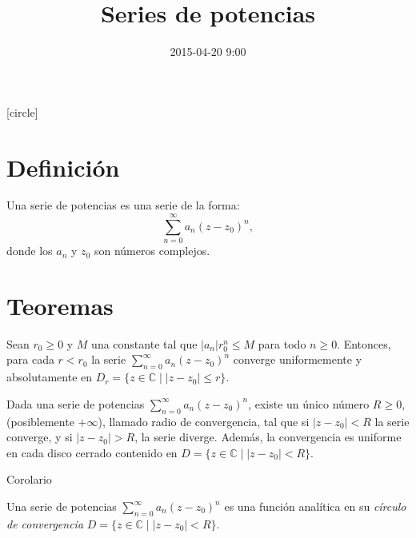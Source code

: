 \documentclass[spanish,presentation]{beamer}
\date{2015-04-20 9:00}
\title{Series de potencias}
\begin{document}
\maketitle
{}
[circle]

\tableofcontents

\section{Definición}
\label{orgheadline1}

\begin{frame}[label=sec-1-1]{}
\begin{definition}
Una \alert{serie de potencias} es una serie de la forma:
\begin{displaymath}
\sum_{n=0}^{\infty}a_{n}(z-z_{0})^{n},
\end{displaymath}
donde los \(a_{n}\) y \(z_{0}\) son números complejos.
\end{definition}
\end{frame}


\section{Teoremas}
\label{orgheadline1}

\begin{frame}[label=sec-2-1]{}
\begin{lemma}
Sean \(r_{0}\geq0\) y \(M\) una constante tal que
\(|a_{n}|r_{0}^{n}\leq M\) para todo \(n\geq0\). Entonces, para
cada \(r<r_{0}\) la serie
\(\sum_{n=0}^{\infty}a_{n}(z-z_{0})^{n}\) converge uniformemente y
absolutamente en \(D_{r}=\{z\in \mathbb{C}\mid |z-z_{0}|\leq r\}\).
\end{lemma}

\begin{theorem}
Dada una serie de potencias
\(\sum_{n=0}^{\infty}a_{n}(z-z_{0})^{n}\), existe un único número
\(R\geq0\), (posiblemente \(+\infty\)), llamado \alert{radio de
convergencia}, tal que si \(|z-z_{0}|<R\) la serie converge, y si
\(|z-z_{0}|>R\), la serie diverge. Además, la convergencia es
uniforme en cada disco cerrado contenido en \(D=\{z\in
    \mathbb{C}\mid |z-z_{0}|< R\}\). 
\end{theorem}
\end{frame}

\begin{frame}[label=sec-2-2]{Corolario}
\begin{corollary}
Una serie de potencias \(\sum_{n=0}^{\infty}a_{n}(z-z_{0})^{n}\)
es una función analítica en su \emph{círculo de convergencia} \(D=\{z\in
    \mathbb{C}\mid |z-z_{0}|< R\}\). 
\end{corollary}
\end{frame}
\end{document}
